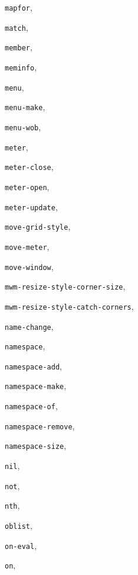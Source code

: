 \begin{theindex}
\item {\tt mapfor}, {\bf\pageref{mapfor}}
\item {\tt match}, {\bf\pageref{match}}
\item {\tt member}, {\bf\pageref{member}}
\item {\tt meminfo}, {\bf\pageref{meminfo}}
\item {\tt menu}, {\bf\pageref{menu}}
\item {\tt menu-make}, {\bf\pageref{menu-make}}
\item {\tt menu-wob}, {\bf\pageref{menu-wob}}
\item {\tt meter}, {\bf\pageref{meter}}
\item {\tt meter-close}, {\bf\pageref{meter-close}}
\item {\tt meter-open}, {\bf\pageref{meter-open}}
\item {\tt meter-update}, {\bf\pageref{meter-update}}
\item {\tt move-grid-style}, {\bf\pageref{move-grid-style}}
\item {\tt move-meter}, {\bf\pageref{move-meter}}
\item {\tt move-window}, {\bf\pageref{move-window}}
\item {\tt mwm-resize-style-corner-size}, {\bf\pageref{mwm-resize-style-corner-size}}
\item {\tt mwm-resize-style-catch-corners}, {\bf\pageref{mwm-resize-style-catch-corners}}
\item {\tt name-change}, {\bf\pageref{name-change}}
\item {\tt namespace}, {\bf\pageref{namespace}}
\item {\tt namespace-add}, {\bf\pageref{namespace-add}}
\item {\tt namespace-make}, {\bf\pageref{namespace-make}}
\item {\tt namespace-of}, {\bf\pageref{namespace-of}}
\item {\tt namespace-remove}, {\bf\pageref{namespace-remove}}
\item {\tt namespace-size}, {\bf\pageref{namespace-size}}
\item {\tt nil}, {\bf\pageref{nil}}
\item {\tt not}, {\bf\pageref{not}}
\item {\tt nth}, {\bf\pageref{nth}}
\item {\tt oblist}, {\bf\pageref{oblist}}
\item {\tt on-eval}, {\bf\pageref{on-eval}}
\item {\tt on}, {\bf\pageref{on}}

\end{theindex}
